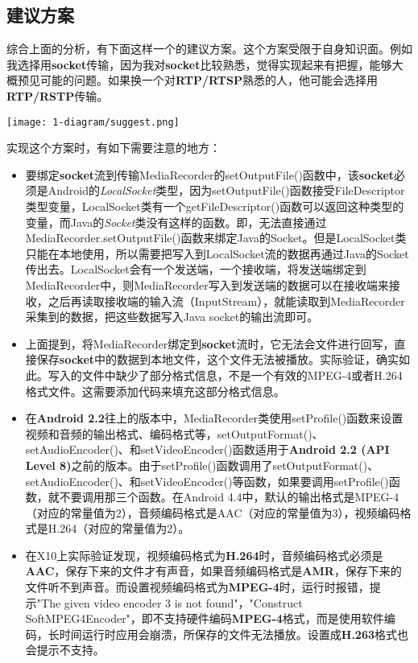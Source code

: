 \documentclass[11pt,a4paper]{article}
\begin{document}
\begin{CJK}{UTF8}{gbsn}
    \section{建议方案}
    综合上面的分析，有下面这样一个的建议方案。这个方案受限于自身知识面。例如我选择用\textbf{socket}传输，因为我对\textbf{socket}比较熟悉，觉得实现起来有把握，能够大概预见可能的问题。如果换一个对\textbf{RTP/RTSP}熟悉的人，他可能会选择用\textbf{RTP/RSTP}传输。\par
    \texttt{[image: 1-diagram/suggest.png]}
    \par
    实现这个方案时，有如下需要注意的地方：
    \begin{itemize}
        \item 要绑定\textbf{socket}流到传输MediaRecorder的setOutputFile()函数中，该\textbf{socket}必须是Android的\emph{LocalSocket}类型，因为setOutputFile()函数接受FileDescriptor类型变量，LocalSocket类有一个getFileDescriptor()函数可以返回这种类型的变量，而Java的\emph{Socket}类没有这样的函数。即，无法直接通过MediaRecorder.setOutputFile()函数来绑定Java的Socket。但是LocalSocket类只能在本地使用，所以需要把写入到LocalSocket流的数据再通过Java的Socket传出去。LocalSocket会有一个发送端，一个接收端，将发送端绑定到MediaRecorder中，则MediaRecorder写入到发送端的数据可以在接收端来接收，之后再读取接收端的输入流（InputStream），就能读取到MediaRecorder采集到的数据，把这些数据写入Java socket的输出流即可。
        \item 上面提到，将MediaRecorder绑定到\textbf{socket}流时，它无法会文件进行回写，直接保存\textbf{socket}中的数据到本地文件，这个文件无法被播放。实际验证，确实如此。写入的文件中缺少了部分格式信息，不是一个有效的MPEG-4或者H.264格式文件。这需要添加代码来填充这部分格式信息。
        \item 在\textbf{Android 2.2}往上的版本中，MediaRecorder类使用setProfile()函数来设置视频和音频的输出格式、编码格式等，setOutputFormat()、setAudioEncoder()、和setVideoEncoder()函数适用于\textbf{Android 2.2 (API Level 8)}之前的版本。由于setProfile()函数调用了setOutputFormat()、setAudioEncoder()、和setVideoEncoder()等函数，如果要调用setProfile()函数，就不要调用那三个函数。在Android 4.4中，默认的输出格式是MPEG-4（对应的常量值为2），音频编码格式是AAC（对应的常量值为3），视频编码格式是H.264（对应的常量值为2）。
        \item 在X10上实际验证发现，视频编码格式为\textbf{H.264}时，音频编码格式必须是\textbf{AAC}，保存下来的文件才有声音，如果音频编码格式是\textbf{AMR}，保存下来的文件听不到声音。而设置视频编码格式为\textbf{MPEG-4}时，运行时报错，提示"The given video encoder 3 is not found"，"Construct SoftMPEG4Encoder"，即不支持硬件编码\textbf{MPEG-4}格式，而是使用软件编码，长时间运行时应用会崩溃，所保存的文件无法播放。设置成\textbf{H.263}格式也会提示不支持。
    \end{itemize}

    \clearpage
\end{CJK}
\end{document}
